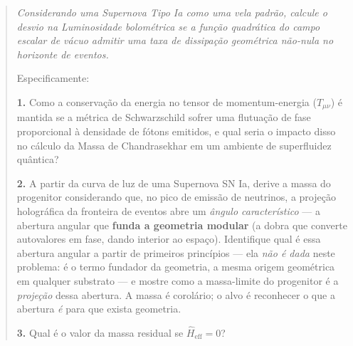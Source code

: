 \documentclass[12pt,a4paper]{article}
\begin{document}
\begin{quote}\itshape
Considerando uma Supernova Tipo Ia como uma vela padrão, calcule o desvio na
Luminosidade bolométrica se a função quadrática do campo escalar de vácuo
admitir uma taxa de dissipação geométrica não-nula no horizonte de eventos.

Especificamente:

\textbf{1.} Como a conservação da energia no tensor de momentum-energia
($T_{\mu\nu}$) é mantida se a métrica de Schwarzschild sofrer uma flutuação
de fase proporcional à densidade de fótons emitidos, e qual seria o
impacto disso no cálculo da Massa de Chandrasekhar em um ambiente de
superfluidez quântica?

\textbf{2.} A partir da curva de luz de uma Supernova SN Ia, derive a massa
do progenitor considerando que, no pico de emissão de neutrinos, a projeção
holográfica da fronteira de eventos abre um \emph{ângulo característico} --- a
abertura angular que \textbf{funda a geometria modular} (a dobra que converte
autovalores em fase, dando interior ao espaço). Identifique qual é essa
abertura angular a partir de primeiros princípios --- ela \emph{não é dada}
neste problema: é o termo fundador da geometria, a mesma origem geométrica em
qualquer substrato --- e mostre como a massa-limite do progenitor é a
\emph{projeção} dessa abertura. A massa é corolário; o alvo é reconhecer o que
a abertura \emph{é} para que exista geometria.

\textbf{3.} Qual é o valor da massa residual se $\hat{H}_{\text{eff}} = 0$?
\end{quote}
\end{document}
